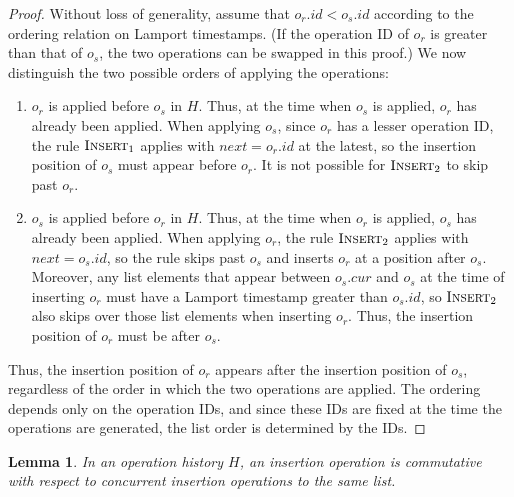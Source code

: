 \documentclass[10pt,journal,compsoc]{IEEEtran}
\newtheorem{lemma}[theorem]{Lemma}
\begin{document}
\begin{proof}
Without loss of generality, assume that $o_r.\mathit{id} < o_s.\mathit{id}$ according to the ordering relation on Lamport timestamps. (If the operation ID of $o_r$ is greater than that of $o_s$, the two operations can be swapped in this proof.) We now distinguish the two possible orders of applying the operations:

\begin{enumerate}
\item $o_r$ is applied before $o_s$ in $H$. Thus, at the time when $o_s$ is applied, $o_r$ has already been applied. When applying $o_s$, since $o_r$ has a lesser operation ID, the rule $\textsc{Insert}_1$ applies with $\mathit{next} = o_r.\mathit{id}$ at the latest, so the insertion position of $o_s$ must appear before $o_r$. It is not possible for $\textsc{Insert}_2$ to skip past $o_r$.

\item $o_s$ is applied before $o_r$ in $H$. Thus, at the time when $o_r$ is applied, $o_s$ has already been applied. When applying $o_r$, the rule $\textsc{Insert}_2$ applies with $\mathit{next} = o_s.\mathit{id}$, so the rule skips past $o_s$ and inserts $o_r$ at a position after $o_s$. Moreover, any list elements that appear between $o_s.\mathit{cur}$ and $o_s$ at the time of inserting $o_r$ must have a Lamport timestamp greater than $o_s.\mathit{id}$, so $\textsc{Insert}_2$ also skips over those list elements when inserting $o_r$. Thus, the insertion position of $o_r$ must be after $o_s$.
\end{enumerate}

Thus, the insertion position of $o_r$ appears after the insertion position of $o_s$, regardless of the order in which the two operations are applied. The ordering depends only on the operation IDs, and since these IDs are fixed at the time the operations are generated, the list order is determined by the IDs.
\end{proof}

\begin{lemma}\label{lem:insert-reorder}
In an operation history $H$, an insertion operation is commutative with respect to concurrent insertion operations to the same list.
\end{lemma}
\end{document}

